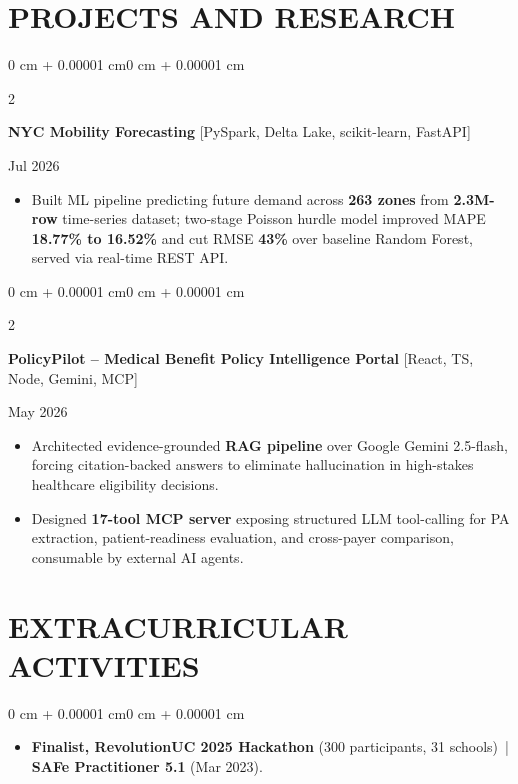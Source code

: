 \documentclass[10pt, letterpaper]{article}
\newenvironment{highlights}{
    \begin{itemize}[
        topsep=0.10 cm,
        parsep=0.06 cm,
        partopsep=0pt,
        itemsep=0.06 cm,
        leftmargin=12pt
    ]
}{
    \end{itemize}
}
\newenvironment{onecolentry}{
    \begin{adjustwidth}{0 cm + 0.00001 cm}{0 cm + 0.00001 cm}
}{
    \end{adjustwidth}
}
\newenvironment{twocolentry}[2][]{
    \onecolentry
    \def\secondColumn{#2}
    \setcolumnwidth{\fill, 4.5 cm}
    \begin{paracol}{2}
}{
    \switchcolumn \raggedleft \secondColumn
    \end{paracol}
    \endonecolentry
}
\begin{document}
\section{PROJECTS AND RESEARCH}
\begin{twocolentry}{Jul 2026}
\textbf{NYC Mobility Forecasting} [PySpark, Delta Lake, scikit-learn, FastAPI]
\end{twocolentry}
\begin{highlights}
  \item Built ML pipeline predicting future demand across \textbf{263 zones} from \textbf{2.3M-row} time-series dataset; two-stage Poisson hurdle model improved MAPE \textbf{18.77\% to 16.52\%} and cut RMSE \textbf{43\%} over baseline Random Forest, served via real-time REST API.
\end{highlights}

\vspace{0.12 cm}

\begin{twocolentry}{May 2026}
\textbf{PolicyPilot -- Medical Benefit Policy Intelligence Portal} [React, TS, Node, Gemini, MCP]
\end{twocolentry}
\begin{highlights}
  \item Architected evidence-grounded \textbf{RAG pipeline} over Google Gemini 2.5-flash, forcing citation-backed answers to eliminate hallucination in high-stakes healthcare eligibility decisions.
  \item Designed \textbf{17-tool MCP server} exposing structured LLM tool-calling for PA extraction, patient-readiness evaluation, and cross-payer comparison, consumable by external AI agents.
\end{highlights}

\section{EXTRACURRICULAR ACTIVITIES}
\begin{onecolentry}
\begin{highlights}
  \item \textbf{Finalist, RevolutionUC 2025 Hackathon} (300 participants, 31 schools) \,|\, \textbf{SAFe Practitioner 5.1} (Mar 2023).
\end{highlights}
\end{onecolentry}
\end{document}
